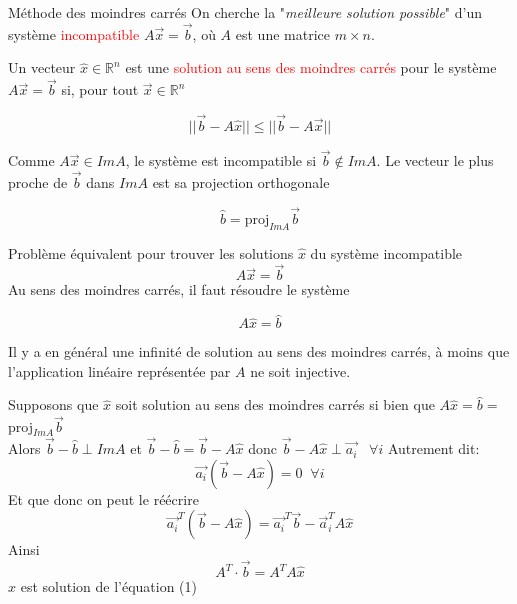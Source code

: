\begin{parag}{Méthode des moindres carrés}
    On cherche la "\textit{meilleure solution possible}" d'un système \textcolor{red}{incompatible} $A\vec{x} = \vec{b}$, où $A$ est une matrice $m \times n$.
    \begin{definition}
        Un vecteur $\hat{x} \in \mathbb{R}^n$ est une \textcolor{red}{solution au sens des moindres carrés} pour le système $A\vec{x} = \vec{b}$ si, pour tout $\vec{x} \in \mathbb{R}^n$
        \begin{formule}
            \[||\vec{b}-A\hat{x}|| \leq ||\vec{b} - A\vec{x}||\]
        \end{formule}
        
    \end{definition}
    Comme $A\vec{x} \in ImA$, le système est incompatible si $\vec{b} \notin ImA$. Le vecteur le plus proche de $\vec{b}$ dans $ImA$ est sa projection orthogonale
    \begin{formule}
        \[\hat{b} = \text{proj}_{ImA}\vec{b}\]
    \end{formule}
    \begin{subparag}{Problème équivalent}
        pour trouver les solutions $\hat{x}$ du système incompatible
        \[A\vec{x} = \vec{b}\]
        Au sens des moindres carrés, il faut résoudre le système
        \begin{formule}
            \[A\hat{x} = \hat{b}\]
        \end{formule}
        \begin{framedremark}
            Il y a en général une infinité de solution au sens des moindres carrés, à moins que l'application linéaire représentée par $A$ ne soit injective.
        \end{framedremark}
        Supposons que $\hat{x}$ soit solution au sens des moindres carrés si bien que $A\hat{x} = \hat{b} = $ proj$_{ImA}\vec{b}$
        \\
        Alors $\vec{b} - \hat{b} \perp ImA$ et $\vec{b} - \hat{b} = \vec{b} - A\hat{x}$ donc $\vec{b} - A\hat{x} \perp \vec{a_i} \; \; \; \forall i$ Autrement dit:
        \[\vec{a_i}(\vec{b} - A\hat{x}) = 0 \; \; \forall i\]
        Et que donc on peut le réécrire
        \[\vec{a_i}^T(\vec{b} - A\hat{x}) = \vec{a_i}^T\vec{b} - \vec{a}_i^TA\hat{x}\]
        Ainsi
        \begin{equation}
            A^T\cdot\vec{b} = A^TA\hat{x}
        \end{equation}
        $\hat{x}$ est solution de l'équation  (1) 
        
    \end{subparag}
\end{parag}
